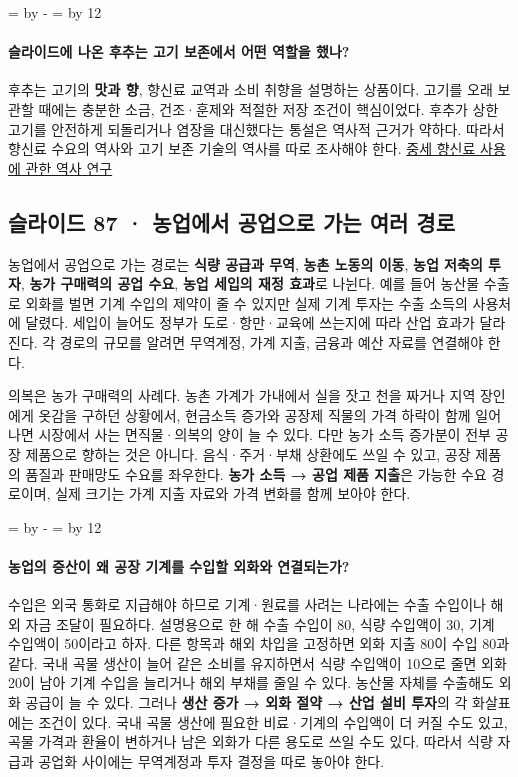 \documentclass[10pt,a4paper]{article}
\newcommand{\ReserveQuestionSpace}{%
  \par\begingroup
  \dimen0=\pagegoal \advance\dimen0 by -\pagetotal
  \dimen2=\baselineskip \multiply\dimen2 by 12
  \ifdim\dimen0<\dimen2 \newpage\fi
  \endgroup}
\begin{document}
\ReserveQuestionSpace
\paragraph{슬라이드에 나온 후추는 고기 보존에서 어떤 역할을 했나?}
후추는 고기의 \textbf{맛과 향}, 향신료 교역과 소비 취향을 설명하는 상품이다. 고기를 오래 보관할 때에는 충분한 소금, 건조·훈제와 적절한 저장 조건이 핵심이었다. 후추가 상한 고기를 안전하게 되돌리거나 염장을 대신했다는 통설은 역사적 근거가 약하다. 따라서 향신료 수요의 역사와 고기 보존 기술의 역사를 따로 조사해야 한다. \href{https://www.sciencedirect.com/science/article/pii/S0195666381800335}{중세 향신료 사용에 관한 역사 연구}\par

\subsection{슬라이드 87 · 농업에서 공업으로 가는 여러 경로}
농업에서 공업으로 가는 경로는 \textbf{식량 공급과 무역}, \textbf{농촌 노동의 이동}, \textbf{농업 저축의 투자}, \textbf{농가 구매력의 공업 수요}, \textbf{농업 세입의 재정 효과}로 나뉜다. 예를 들어 농산물 수출로 외화를 벌면 기계 수입의 제약이 줄 수 있지만 실제 기계 투자는 수출 소득의 사용처에 달렸다. 세입이 늘어도 정부가 도로·항만·교육에 쓰는지에 따라 산업 효과가 달라진다. 각 경로의 규모를 알려면 무역계정, 가계 지출, 금융과 예산 자료를 연결해야 한다.\par

의복은 농가 구매력의 사례다. 농촌 가계가 가내에서 실을 잣고 천을 짜거나 지역 장인에게 옷감을 구하던 상황에서, 현금소득 증가와 공장제 직물의 가격 하락이 함께 일어나면 시장에서 사는 면직물·의복의 양이 늘 수 있다. 다만 농가 소득 증가분이 전부 공장 제품으로 향하는 것은 아니다. 음식·주거·부채 상환에도 쓰일 수 있고, 공장 제품의 품질과 판매망도 수요를 좌우한다. \textbf{농가 소득 → 공업 제품 지출}은 가능한 수요 경로이며, 실제 크기는 가계 지출 자료와 가격 변화를 함께 보아야 한다.\par

\ReserveQuestionSpace
\paragraph{농업의 증산이 왜 공장 기계를 수입할 외화와 연결되는가?}
수입은 외국 통화로 지급해야 하므로 기계·원료를 사려는 나라에는 수출 수입이나 해외 자금 조달이 필요하다. 설명용으로 한 해 수출 수입이 80, 식량 수입액이 30, 기계 수입액이 50이라고 하자. 다른 항목과 해외 차입을 고정하면 외화 지출 80이 수입 80과 같다. 국내 곡물 생산이 늘어 같은 소비를 유지하면서 식량 수입액이 10으로 줄면 외화 20이 남아 기계 수입을 늘리거나 해외 부채를 줄일 수 있다. 농산물 자체를 수출해도 외화 공급이 늘 수 있다. 그러나 \textbf{생산 증가 → 외화 절약 → 산업 설비 투자}의 각 화살표에는 조건이 있다. 국내 곡물 생산에 필요한 비료·기계의 수입액이 더 커질 수도 있고, 곡물 가격과 환율이 변하거나 남은 외화가 다른 용도로 쓰일 수도 있다. 따라서 식량 자급과 공업화 사이에는 무역계정과 투자 결정을 따로 놓아야 한다.\par
\end{document}
